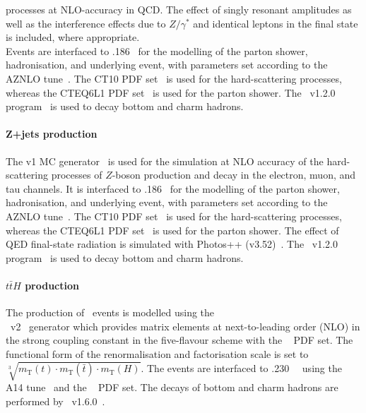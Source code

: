 processes at NLO-accuracy in QCD. The effect of singly resonant
amplitudes as well as the interference effects due to $Z/\gamma^*$ and
identical leptons in the final state is included, where appropriate. \\
Events are interfaced to \pythia{}.186~\cite{Sjostrand:2007gs}
for the modelling of the parton shower, hadronisation, and underlying
event, with parameters set according to the AZNLO
tune~\cite{STDM-2012-23}. The CT10 PDF set~\cite{Lai:2010vv} is used
for the hard-scattering processes, whereas the CTEQ6L1 PDF
set~\cite{Pumplin:2002vw} is used for the parton shower. The \evtgen~v1.2.0
program~\cite{EvtGen} is used to decay bottom and charm hadrons.

\paragraph{Z+jets production}     
The \powhegbox v1 MC generator~\cite{Nason:2004rx,Frixione:2007vw,Alioli:2010xd,Alioli:2008gx}
is used for the simulation at NLO accuracy of the hard-scattering processes of 
$Z$-boson production and decay in the electron, muon, and tau
channels. It is interfaced to \pythia{}.186~\cite{Sjostrand:2007gs}
for the modelling of the parton shower, hadronisation, and underlying
event, with parameters set according to the AZNLO
tune~\cite{STDM-2012-23}. The CT10 PDF set~\cite{Lai:2010vv} is used
for the hard-scattering processes, whereas the CTEQ6L1 PDF
set~\cite{Pumplin:2002vw} is used for the parton shower. The effect of
QED final-state radiation is simulated with Photos++
(v3.52)~\cite{Golonka:2005pn,Davidson:2010ew}. The \evtgen~v1.2.0
program~\cite{Lange:2001uf} is used to decay bottom and charm hadrons.

\paragraph{$t\bar{t}H$ production}
The production of \ttH\ events is modelled using the\\
\powhegbox~v2~\cite{Frixione:2007nw,Nason:2004rx,Frixione:2007vw,Alioli:2010xd,Hartanto:2015uka}
generator which provides matrix elements at next-to-leading order (NLO) in the strong coupling 
constant \alphas in the five-flavour scheme with the \nnpdfnlo~\cite{Ball:2014uwa} PDF set.
The functional form of the renormalisation and factorisation scale is 
set to $\sqrt[3]{m_\text{T}(t)\cdot m_\text{T}(\bar{t}) \cdot m_\text{T}(H)}$.
The events are interfaced to \pythia.230~\cite{Sjostrand:2014zea}~
using the A14 tune~\cite{ATL-PHYS-PUB-2014-021} and the
\nnpdftwo~\cite{Ball:2014uwa} PDF set. The decays of bottom and charm hadrons
are performed by \evtgen~v1.6.0~\cite{Lange:2001uf}.

